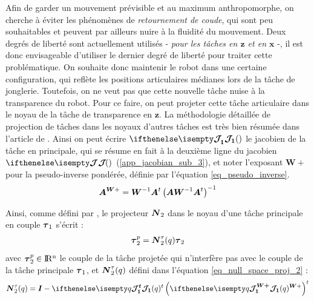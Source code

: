 \documentclass[12pt, a4paper]{article} %
\numberwithin{equation}{section}
\begin{document}
Afin de garder un mouvement prévisible et au maximum anthropomorphe, on cherche à éviter les phénomènes de \textit{retournement de coude}, qui sont peu souhaitables et peuvent par ailleurs nuire à la fluidité du mouvement. Deux degrés de liberté sont actuellement utilisés - \textit{pour les tâches en $\mathbf{z}$ et en $\mathbf{x}$} -, il est donc envisageable d'utiliser le dernier degré de liberté pour traiter cette problématique. On souhaite donc maintenir le robot dans une certaine configuration, qui reflète les positions articulaires médianes lors de la tâche de jonglerie. Toutefois, on ne veut pas que cette nouvelle tâche nuise à la transparence du robot. 
%
\newlineBlank
%
Pour ce faire, on peut projeter cette tâche articulaire dans le noyau de la tâche de transparence en $\mathbf{z}$. La méthodologie détaillée de projection de tâches dans les noyaux d'autres tâches est très bien résumée dans l'article de \cite{dietrich_overview_2015}. Ainsi on peut écrire $ \jacobian{}{1}{} $ le jacobien de la tâche en principale, qui se résume en fait à la deuxième ligne du jacobien $ \jacobian{}{}{} $ (\cref{app_jacobian_sub_3}), et noter l'exposant $ \mathbf{W}+ $ pour la pseudo-inverse pondérée, définie par l'équation \cref{eq_pseudo_inverse}.
%
\begin{equation} \label{eq_pseudo_inverse}
	\begin{split}
	\matr{A}^{\matr{W}+} = \matr{W}^{-1}\matr{A}^t\left(\matr{AW}^{-1}\matr{A}^t\right)^{-1}
	\end{split}
\end{equation}

Ainsi, comme défini par \cite{dietrich_overview_2015}, le projecteur $ \matr{N}_2 $ dans le noyau d'une tâche principale en couple $ \vect{\tau}_1 $ s'écrit :
%
\begin{equation} \label{eq_null_space_proj}
	\begin{split}
	\vect{\tau}_2^p = \matr{N}_2^\tau(q)\vect{\tau}_2	
	\end{split}
\end{equation}
%
avec $ \vect{\tau}_2^p \in \R^n $ le couple de la tâche projetée qui n'interfère pas avec le couple de la tâche principale $ \vect{\tau}_1 $, et $ \matr{N}_2^\tau(q) $ défini dans l'équation \cref{eq_null_space_proj_2} :
%
\begin{equation} \label{eq_null_space_proj_2}
	\matr{N}_2^\tau(q) = \matr{I} - \jacobian{q}{1}{t}\left(\jacobian{q}{1}{\matr{W}+}\right)^t
\end{equation}
\end{document}
